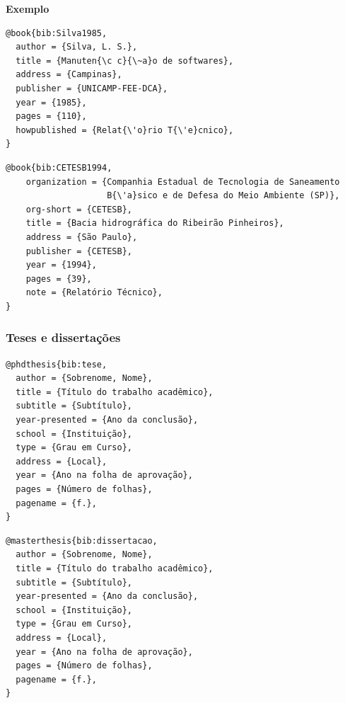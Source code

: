 \documentclass[a4paper,12pt,oneside,onecolumn,final,fleqn]{repUERJ}
\begin{document}
\noindent\textbf{Exemplo}\\

\noindent{}

\begin{verbatim}
@book{bib:Silva1985,
  author = {Silva, L. S.},
  title = {Manuten{\c c}{\~a}o de softwares},
  address = {Campinas},
  publisher = {UNICAMP-FEE-DCA},
  year = {1985},
  pages = {110},
  howpublished = {Relat{\'o}rio T{\'e}cnico},
}
\end{verbatim}

\noindent{}

\begin{verbatim}
@book{bib:CETESB1994,
    organization = {Companhia Estadual de Tecnologia de Saneamento 
                    B{\'a}sico e de Defesa do Meio Ambiente (SP)},
    org-short = {CETESB},
    title = {Bacia hidrográfica do Ribeirão Pinheiros},
    address = {São Paulo},
    publisher = {CETESB},
    year = {1994},
    pages = {39},
    note = {Relatório Técnico},
}
\end{verbatim}

\subsubsection{Teses e dissertações}

\noindent{}

\begin{verbatim}
@phdthesis{bib:tese,
  author = {Sobrenome, Nome},
  title = {Título do trabalho acadêmico},
  subtitle = {Subtítulo},
  year-presented = {Ano da conclusão},
  school = {Instituição},
  type = {Grau em Curso},
  address = {Local},
  year = {Ano na folha de aprovação},
  pages = {Número de folhas},
  pagename = {f.},
}
\end{verbatim}

\noindent{}

\begin{verbatim}
@masterthesis{bib:dissertacao,
  author = {Sobrenome, Nome},
  title = {Título do trabalho acadêmico},
  subtitle = {Subtítulo},
  year-presented = {Ano da conclusão},
  school = {Instituição},
  type = {Grau em Curso},
  address = {Local},
  year = {Ano na folha de aprovação},
  pages = {Número de folhas},
  pagename = {f.},
}
\end{verbatim}
\end{document}
